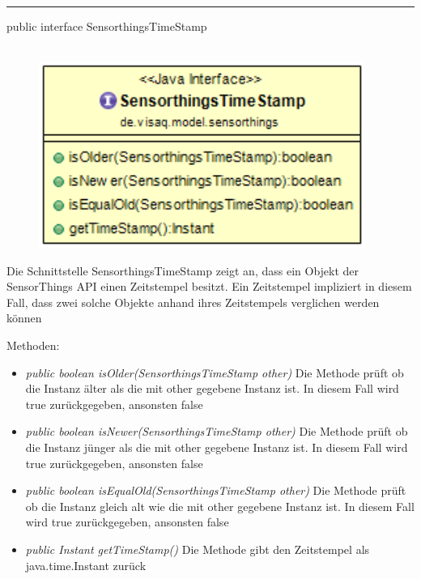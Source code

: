 \rule{\textwidth}{0.4pt}
public interface SensorthingsTimeStamp
\\\\
\begin{minipage}{0.4\textwidth}
    \begin{figure}[H]
        {\centering\includegraphics[width=0.95\textwidth]{media/backend/modell/classes/SensorthingsTimeStamp.png}}
    \end{figure}
    \end{minipage} \hfill
\begin{minipage}{0.6\textwidth}
Die Schnittstelle SensorthingsTimeStamp zeigt an, dass ein Objekt der \gls{SensorThings API} einen Zeitstempel besitzt.
Ein Zeitstempel impliziert in diesem Fall, dass zwei solche Objekte anhand ihres Zeitstempels verglichen werden können
\end{minipage}

Methoden: \begin{itemize}
    \item \emph{public boolean isOlder(SensorthingsTimeStamp other)} Die Methode prüft ob die Instanz älter als die mit other gegebene Instanz ist.
    In diesem Fall wird true zurückgegeben, ansonsten false
    \item \emph{public boolean isNewer(SensorthingsTimeStamp other)} Die Methode prüft ob die Instanz jünger als die mit other gegebene Instanz ist.
    In diesem Fall wird true zurückgegeben, ansonsten false
    \item \emph{public boolean isEqualOld(SensorthingsTimeStamp other)} Die Methode prüft ob die Instanz gleich alt wie die mit other gegebene Instanz ist.
    In diesem Fall wird true zurückgegeben, ansonsten false
    \item \emph{public Instant getTimeStamp()} Die Methode gibt den Zeitstempel als java.time.Instant zurück
\end{itemize}

